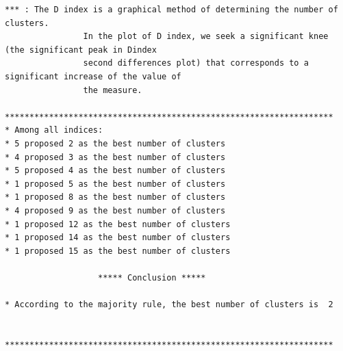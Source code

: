 \documentclass[
]{article}
\begin{document}
\begin{verbatim}
*** : The D index is a graphical method of determining the number of clusters. 
                In the plot of D index, we seek a significant knee (the significant peak in Dindex
                second differences plot) that corresponds to a significant increase of the value of
                the measure. 
 
******************************************************************* 
* Among all indices:                                                
* 5 proposed 2 as the best number of clusters 
* 4 proposed 3 as the best number of clusters 
* 5 proposed 4 as the best number of clusters 
* 1 proposed 5 as the best number of clusters 
* 1 proposed 8 as the best number of clusters 
* 4 proposed 9 as the best number of clusters 
* 1 proposed 12 as the best number of clusters 
* 1 proposed 14 as the best number of clusters 
* 1 proposed 15 as the best number of clusters 

                   ***** Conclusion *****                            
 
* According to the majority rule, the best number of clusters is  2 
 
 
******************************************************************* 
\end{verbatim}
\end{document}

